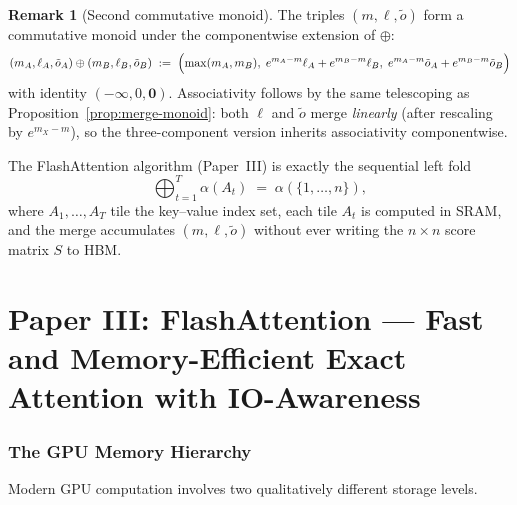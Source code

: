 \documentclass[11pt]{amsart}
\theoremstyle{plain}
\theoremstyle{definition}
\newtheorem{remark}[theorem]{Remark}
\begin{document}
\begin{remark}[Second commutative monoid]
The triples $(m,\ell,\tilde{o})$ form a commutative monoid under the
componentwise extension of $\oplus$:
\[
    (m_A,\ell_A,\tilde{o}_A) \oplus (m_B,\ell_B,\tilde{o}_B)
    \;:=\;
    \Bigl(
        \max(m_A,m_B),\;
        e^{m_A-m}\ell_A + e^{m_B-m}\ell_B,\;
        e^{m_A-m}\tilde{o}_A + e^{m_B-m}\tilde{o}_B
    \Bigr)
\]
with identity $(-\infty, 0, \mathbf{0})$.  Associativity follows by the
same telescoping as Proposition~\ref{prop:merge-monoid}: both $\ell$ and
$\tilde{o}$ merge \emph{linearly} (after rescaling by $e^{m_X-m}$), so
the three-component version inherits associativity componentwise.

The FlashAttention algorithm (Paper~III) is exactly the sequential left fold
\[
    \bigoplus_{t=1}^{T} \alpha(A_t)
    \;=\;
    \alpha(\{1,\ldots,n\}),
\]
where $A_1,\ldots,A_T$ tile the key--value index set, each tile $A_t$ is
computed in SRAM, and the merge accumulates $(m, \ell, \tilde{o})$ without
ever writing the $n\times n$ score matrix $S$ to HBM.
\end{remark}

\part{Paper III: FlashAttention --- Fast and Memory-Efficient Exact Attention with IO-Awareness}
\label{part:paper-iii}

\section{The GPU Memory Hierarchy}
\label{sec:memory-hierarchy}

Modern GPU computation involves two qualitatively different storage levels.
\end{document}
